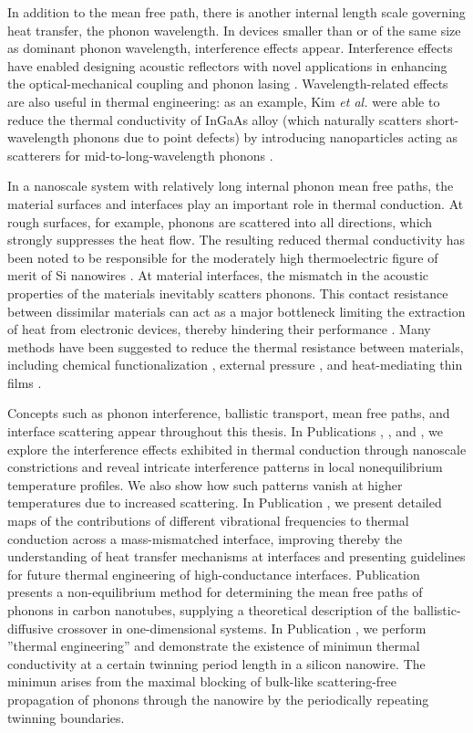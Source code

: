 In addition to the mean free path, there is another internal length scale governing heat transfer, the phonon wavelength. In devices smaller than or of the same size as dominant phonon wavelength, interference effects appear. Interference effects have enabled designing acoustic reflectors with novel applications in enhancing the optical-mechanical coupling \cite{fainstein13} and phonon lasing \cite{maryam13}. Wavelength-related effects are also useful in thermal engineering: as an example, Kim \textit{et al.} were able to reduce the thermal conductivity of InGaAs alloy (which naturally scatters short-wavelength phonons due to point defects) by introducing nanoparticles acting as scatterers for mid-to-long-wavelength phonons \cite{kim06}. %

In a nanoscale system with relatively long internal phonon mean free paths, the material surfaces and interfaces play an important role in thermal conduction. At rough surfaces, for example, phonons are scattered into all directions, which strongly suppresses the heat flow. The resulting reduced thermal conductivity has been noted to be responsible for the moderately high thermoelectric figure of merit of Si nanowires \cite{hochbaum08}. At material interfaces, the mismatch in the acoustic properties of the materials inevitably scatters phonons.  This contact resistance between dissimilar materials can act as a major bottleneck limiting the extraction of heat from electronic devices, thereby hindering their performance \cite{pop10}. Many methods have been suggested to reduce the thermal resistance between materials, including chemical functionalization \cite{hopkins11,kaur14}, external pressure \cite{shen11,chalopin12}, and heat-mediating thin films \cite{english12}. %

Concepts such as phonon interference, ballistic transport, mean free paths, and interface scattering appear throughout this thesis. In Publications , , and , we explore the interference effects exhibited in thermal conduction through nanoscale constrictions and reveal intricate interference patterns in local nonequilibrium temperature profiles. We also show how such patterns vanish at higher temperatures due to increased scattering. In Publication , we present detailed maps of the contributions of different vibrational frequencies to thermal conduction across a mass-mismatched interface, improving thereby the understanding of heat transfer mechanisms at interfaces and presenting guidelines for future thermal engineering of high-conductance interfaces. Publication  presents a non-equilibrium method for determining the mean free paths of phonons in carbon nanotubes, supplying a theoretical description of the ballistic-diffusive crossover in one-dimensional systems. In Publication , we perform ''thermal engineering'' and demonstrate the existence of minimun thermal conductivity at a certain twinning period length in a silicon nanowire. The minimun arises from the maximal blocking of bulk-like scattering-free propagation of phonons through the nanowire by the periodically repeating twinning boundaries.


